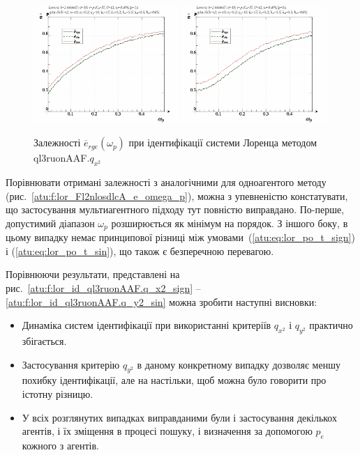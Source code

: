 \begin{figure}[ht!]
  \centerline{
    \includegraphics[width=0.49\textwidth]{p/cha/lor/ql3ruonAAF/lor_ql3ruonAAF_qx2-p_omega_p_e_sign.png}
    \hfill
    \includegraphics[width=0.49\textwidth]{p/cha/lor/ql3ruonAAF/lor_ql3ruonAAF_qx2-p_omega_p_e_sin.png}
  }
\caption{Залежності $ \overline{e}_{rge} (\omega_p) $ при ідентифікації системи Лоренца методом ql3ruonAAF.$q_{x^2} $}
\label{atu:f:lor_ql3ruonAAF_e_omega_p}
\end{figure}

Порівнювати отримані залежності з аналогічними для
одноагентого методу (рис.~\ref{atu:f:lor_Fl2nlosdlcA_e_omega_p}), можна з
упевненістю констатувати, що застосування мультиагентного
підходу тут повністю виправдано. По-перше, допустимий діапазон
$ \omega_p $ розширюється як мінімум на порядок. З іншого боку, в цьому
випадку немає принципової різниці між умовами~(\ref{atu:eq:lor_po_t_sign})
і (\ref{atu:eq:lor_po_t_sin}), що також є безперечною перевагою.




Порівнюючи результати, представлені на
рис.~\ref{atu:f:lor_id_ql3ruonAAF.q_x2_sign} -- \ref{atu:f:lor_id_ql3ruonAAF.q_y2_sin} можна зробити
наступні висновки:

\begin{itemize}

  \item
   Динаміка систем ідентифікації при використанні критеріїв $ q_{x^2} $ і $ q_{y^2} $ практично збігається.

  \item
    Застосування критерію
    $ q_{y^2} $ в даному конкретному випадку дозволяє меншу похибку
    ідентифікації, але на настільки, щоб можна було говорити про
    істотну різницю.

  \item
    У всіх розглянутих випадках виправданими були і застосування
    декількох агентів, і їх зміщення в процесі пошуку, і визначення
    за допомогою
    $p_e$ кожного з агентів.

\end{itemize}

